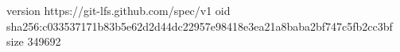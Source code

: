 version https://git-lfs.github.com/spec/v1
oid sha256:c033537171b83b5e62d2d44dc22957e98418e3ea21a8baba2bf747c5fb2cc3bf
size 349692
